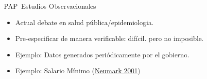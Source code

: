 \documentclass{beamer}
\begin{document}
{ %
    \begin{frame}[plain]
     \end{frame}
}


\begin{frame}{PAP--Estudios Observacionales}
\begin{itemize}[<.->]
\item Actual debate en salud pública/epidemiologia.
\item Pre-especificar de manera verificable: difícil. pero no imposible.
\item Ejemplo: Datos generados periódicamente por el gobierno.
\item Ejemplo: Salario Mínimo (\href{http://onlinelibrary.wiley.com/doi/10.1111/0019-8676.00199/full}{Neumark 2001})
\end{itemize}
\end{frame}
\end{document}
